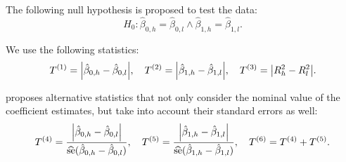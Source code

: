 \begin{block}{}

	The following null hypothesis is proposed to test the data:
	\begin{equation}
		H_{0} : \hat{\beta}_{0,h} = \hat{\beta}_{0,l} \wedge \hat{\beta}_{1,h} = \hat{\beta}_{1,l}
		.
	\end{equation}

	We use the following statistics:
	\begin{equation}
		T^{(1)} = \abs{\hat{\beta}_{0,h} - \hat{\beta}_{0,l}}
		\qc
		T^{(2)} = \abs{\hat{\beta}_{1,h} - \hat{\beta}_{1,l}}
		\qc
		T^{(3)} = \abs{ R^{2}_{h} - R^{2}_{l} } \label{eq:h0-stat-simple} .
	\end{equation}

	\citeauthor{Polko-Zajac2016} \cite{Polko-Zajac2016} proposes alternative statistics that not only consider the nominal value of the coefficient estimates, but take into account their standard errors as well:
	\begin{equation}
		T^{(4)} = \frac{\abs{\hat{\beta}_{0,h} - \hat{\beta}_{0,l}}}{\se{\hat{\beta}_{0,h} - \hat{\beta}_{0,l}}}
		\qc
		T^{(5)} = \frac{\abs{\hat{\beta}_{1,h} - \hat{\beta}_{1,l}}}{\se{\hat{\beta}_{1,h} - \hat{\beta}_{1,l}}}
		\qc
		T^{(6)} = T^{(4)} + T^{(5)} \label{eq:h0-stat-polko}.
	\end{equation}

\end{block}

